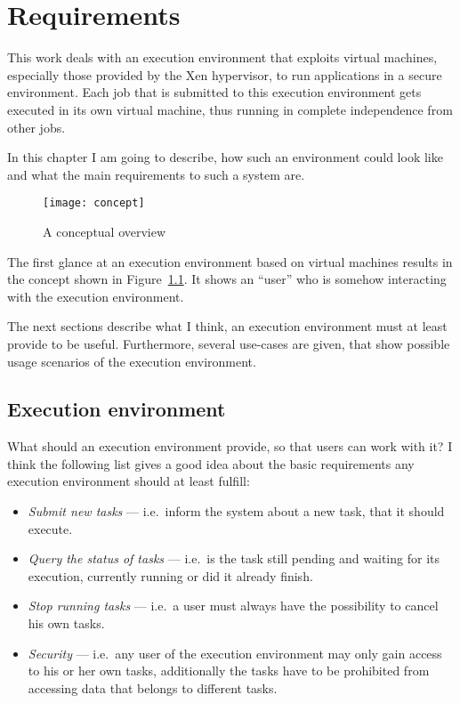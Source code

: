\chapter{Requirements}
\label{cha:requirements}

This  work  deals with  an  execution  environment  that exploits  virtual
machines,  especially  those  provided  by  the  Xen  hypervisor,  to  run
applications in a  secure environment. Each job that  is submitted to this
execution  environment gets  executed  in its  own  virtual machine,  thus
running in complete independence from other jobs.

In this chapter I am going to describe, how such an environment could look
like and what the main requirements to such a system are.

\begin{figure}[htbp]
  \centering
  \texttt{[image: concept]}
  \caption[Conceptual overview]{A conceptual overview}
  \label{fig:concept}
\end{figure}

The first  glance at  an execution environment  based on  virtual machines
results  in the concept  shown in  Figure~\ref{fig:concept}.  It  shows an
``user'' who is somehow interacting with the execution environment.

\medskip

The next sections describe what  I think, an execution environment must at
least provide to be useful. Furthermore, several use-cases are given, that
show possible usage scenarios of the execution environment.

\section{Execution environment}
\label{sec:req-execution-environment}

What should an execution environment  provide, so that users can work with
it?   I  think the  following  list  gives a  good  idea  about the  basic
requirements any execution environment should at least fulfill:

\begin{itemize}
\item \emph{Submit new tasks} --- i.e.~inform the system about a new task,
  that it should execute.
\item \emph{Query the status of  tasks} --- i.e.~is the task still pending
  and  waiting for  its execution,  currently  running or  did it  already
  finish.
\item \emph{Stop running tasks} --- i.e.~a user must always have the
  possibility to cancel his own tasks.
\item \emph{Security}  --- i.e.~any user of the  execution environment may
  only gain access to his or her own tasks, additionally the tasks have to
  be prohibited from accessing data that belongs to different tasks.
\end{itemize}

